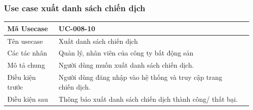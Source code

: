 \documentclass[12pt,a4paper]{article}
\begin{document}

    \subsubsection*{Use case xuất danh sách chiến dịch}
    \begin{table}[H]
        \centering
        \begin{tabular}{|p{3.5cm}|p{11.5cm}|c|}
            \hline
            Mã Usecase      & UC-008-10                                                       \\
            \hline
            Tên usecase     & Xuất danh sách chiến dịch                                       \\
            \hline
            Các tác nhân    & Quản lý, nhân viên của công ty bất động sản                     \\
            \hline
            Mô tả chung     & Người dùng muốn xuất danh sách chiến dịch.                      \\
            \hline

            Điều kiện trước & Người dùng đăng nhập vào hệ thống và truy cập trang chiến dịch. \\
            \hline

            Điều kiện sau   & Thông báo xuất danh sách chiến dịch thành công/ thất bại.       \\
            \hline


\end{tabular}
\end{table}
\end{document}
